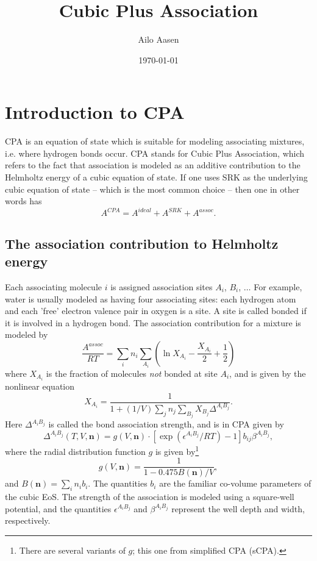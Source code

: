\documentclass[10pt, a4paper]{article}
\title{Cubic Plus Association}
\author{Ailo Aasen}
\date{\today}
\newcommand{\mbf}[0]{\mathbf}
\newcommand{\lp}{\left(}
\newcommand{\rp}{\right)}
\begin{document}
\maketitle
\section{Introduction to CPA}
CPA is an equation of state which is suitable for modeling associating mixtures, i.e. where hydrogen bonds occur. CPA stands for Cubic Plus Association, which refers to the fact that association is modeled as an additive contribution to the Helmholtz energy of a cubic equation of state. If one uses SRK as the underlying cubic equation of state -- which is the most common choice -- then one in other words has
\begin{equation}
  A^{CPA} = A^{ideal} + A^{SRK} + A^{assoc}.
\end{equation}

\subsection{The association contribution to Helmholtz energy}
Each associating molecule $i$ is assigned association sites $A_i$, $B_i$, $\ldots$ For example, water is usually modeled as having four associating sites: each hydrogen atom and each 'free' electron valence pair in oxygen is a site. A site is called bonded if it is involved in a hydrogen bond. The association contribution for a mixture is modeled by
\begin{equation}
  \frac{A^{assoc}}{RT} = \sum_{i} n_i \sum_{A_i} \lp \ln X_{A_i} - \frac{X_{A_i}}{2} + \frac{1}{2} \rp
\end{equation}
where $X_{A_i}$ is the fraction of molecules \textit{not} bonded at site $A_i$, and is given by the nonlinear equation
\begin{equation}
  X_{A_i} = \frac{1}{1+(1/V) \sum_j n_j \sum_{B_j} X_{B_j} \Delta^{A_i B_j}}.
\end{equation}
Here $\Delta^{A_i B_j}$ is called the bond association strength, and is in CPA given by
\begin{equation}
  \Delta^{A_i B_j}(T,V,\mbf n) = g(V,\mbf n) \cdot [\exp(\epsilon^{A_i B_j}/RT) - 1] b_{ij} \beta^{A_i B_j},
\end{equation}
where the radial distribution function $g$ is given by\footnote{There are several variants of $g$; this one from simplified CPA (sCPA).}
\begin{equation}
  g(V,\mbf n) = \frac{1}{1 - 0.475 B(\mbf n)/V},
\end{equation}
and $B(\mbf n) = \sum_i n_i b_i$. The quantities $b_i$ are the familiar co-volume parameters of the cubic EoS. The strength of the association is modeled using a square-well potential, and the quantities $\epsilon^{A_i B_j}$ and $\beta^{A_i B_j}$ represent the well depth and width, respectively.
\end{document}
